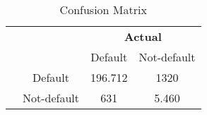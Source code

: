 \begin{table}[H]
     \centering
     \caption{Confusion Matrix}
     \label{tab:Confusion_matrix}
     \begin{tabular}{@{}cc cc@{}}
     \multicolumn{1}{c}{} &\multicolumn{1}{c}{} &\multicolumn{2}{c}{\textbf{Actual}} \\
     \cmidrule(lr){3-4}
     \multicolumn{1}{c}{} & 
     \multicolumn{1}{c}{} & 
     \multicolumn{1}{c}{Default} & 
     \multicolumn{1}{c}{Not-default} \\
     \vspace{0.1cm}
     \cline{2-4}
     \multirow[c]{2}{*}{\rotatebox[origin=tr]{90}{\textbf{Predicted}}} & Default  & 196.712 & 1320 \\[1.5ex] & Not-default &631 & 5.460 \\ \cline{2-4}
     \end{tabular}
     \end{table}